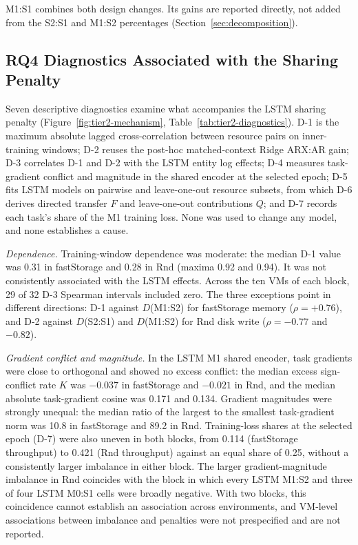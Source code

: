 \documentclass[a4paper,fleqn]{cas-dc}
\begin{document}
M1:S1 combines both design changes. Its gains are reported directly, not
added from the S2:S1 and M1:S2 percentages (Section~\ref{sec:decomposition}).

\subsection{RQ4 Diagnostics Associated with the Sharing Penalty}
\label{sec:results-diagnostics}

Seven descriptive diagnostics examine what accompanies the LSTM sharing
penalty (Figure~\ref{fig:tier2-mechanism}, Table~\ref{tab:tier2-diagnostics}).
D-1 is the maximum absolute lagged cross-correlation between resource pairs on
inner-training windows; D-2 reuses the post-hoc matched-context Ridge ARX:AR
gain; D-3 correlates D-1 and D-2 with the LSTM entity log effects; D-4
measures task-gradient conflict and magnitude in the shared encoder at the
selected epoch; D-5 fits LSTM models on pairwise and leave-one-out resource
subsets, from which D-6 derives directed transfer $F$ and leave-one-out
contributions $Q$; and D-7 records each task's share of the M1 training loss.
None was used to change any model, and none establishes a cause.

\emph{Dependence.} Training-window dependence was moderate: the median D-1
value was 0.31 in fastStorage and 0.28 in Rnd (maxima 0.92 and 0.94). It was
not consistently associated with the LSTM effects. Across the ten VMs of
each block, 29 of 32 D-3 Spearman intervals included zero. The three
exceptions point in different directions: D-1 against $D$(M1:S2) for
fastStorage memory ($\rho=+0.76$), and D-2 against $D$(S2:S1) and
$D$(M1:S2) for Rnd disk write ($\rho=-0.77$ and $-0.82$).

\emph{Gradient conflict and magnitude.} In the LSTM M1 shared encoder, task
gradients were close to orthogonal and showed no excess conflict: the median
excess sign-conflict rate $K$ was $-0.037$ in fastStorage and $-0.021$ in Rnd,
and the median absolute task-gradient cosine was 0.171 and 0.134. Gradient
magnitudes were strongly unequal: the median ratio of the largest to the
smallest task-gradient norm was 10.8 in fastStorage and 89.2 in Rnd.
Training-loss shares at the selected epoch (D-7) were also uneven in both
blocks, from 0.114 (fastStorage throughput) to 0.421 (Rnd throughput)
against an equal share of 0.25, without a consistently larger imbalance in
either block. The larger gradient-magnitude imbalance in Rnd coincides with
the block in
which every LSTM M1:S2 and three of four LSTM M0:S1 cells were broadly
negative. With two blocks, this coincidence cannot establish an association
across environments, and VM-level associations between imbalance and
penalties were not prespecified and are not reported.
\end{document}
